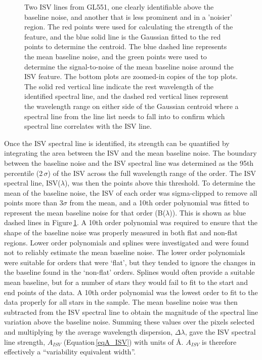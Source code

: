 \begin{figure}[!h]
    \caption{Two ISV lines from GL551, one clearly identifiable above the baseline noise, and another that is less prominent and in a 'noisier' region. The red points were used for calculating the strength of the feature, and the blue solid line is the Gaussian fitted to the red points to determine the centroid. The blue dashed line represents the mean baseline noise, and the green points were used to determine the signal-to-noise of the mean baseline noise around the ISV feature. The bottom plots are zoomed-in copies of the top plots. The solid red vertical line indicate the rest wavelength of the identified spectral line, and the dashed red vertical lines represent the wavelength range on either side of the Gaussian centroid where a spectral line from the line list needs to fall into to confirm which spectral line correlates with the ISV line.}
    \label{figGL551_Element}
\end{figure}

Once the ISV spectral line is identified, its strength can be quantified by integrating the area between the ISV and the mean baseline noise. The boundary between the baseline noise and the ISV spectral line was determined as the 95th percentile (2\,$\sigma$) of the ISV across the full wavelength range of the order. The ISV spectral line, ISV($\lambda$), was then the points above this threshold. To determine the mean of the baseline noise, the ISV of each order was sigma-clipped to remove all points more than 3$\sigma$ from the mean, and a 10th order polynomial was fitted to represent the mean baseline noise for that order (B($\lambda$)). This is shown as blue dashed lines in Figure\,\ref{figGL551_Element}. A 10th order polynomial was required to ensure that the shape of the baseline noise was properly measured in both flat and non-flat regions. Lower order polynomials and splines were investigated and were found not to reliably estimate the mean baseline noise. The lower order polynomials were suitable for orders that were `flat’, but they  tended to ignore the changes in the baseline found in the `non-flat’ orders. Splines would often provide a suitable mean baseline, but for a number of stars they would fail to fit to the start and end points of the data. A 10th order polynomial was the lowest order to fit to the data properly for all stars in the sample. The mean baseline noise was then subtracted from the ISV spectral line to obtain the magnitude of the spectral line variation above the baseline noise. Summing these values over the pixels selected and multiplying by the average wavelength dispersion, $\Delta\lambda$, gave the ISV spectral line strength, $A_{ISV}$ (Equation\,\ref{eqA_ISV}) with units of \hbox{\AA}. $A_{ISV}$ is therefore effectively a ``variability equivalent width''.\\

